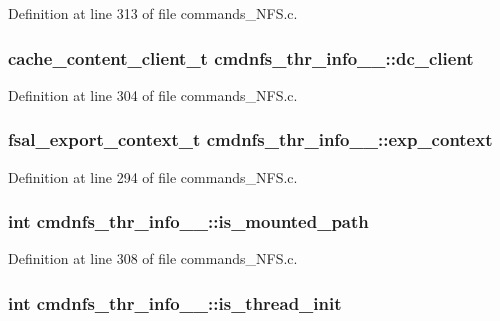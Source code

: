 Definition at line 313 of file commands\_\-NFS.c.
\subsubsection[{dc\_\-client}]{\setlength{\rightskip}{0pt plus 5cm}cache\_\-content\_\-client\_\-t {\bf cmdnfs\_\-thr\_\-info\_\-\_\-::dc\_\-client}}\label{structcmdnfs__thr__info_____25559c5388210fe7b20f047d80e9d969}




Definition at line 304 of file commands\_\-NFS.c.
\subsubsection[{exp\_\-context}]{\setlength{\rightskip}{0pt plus 5cm}fsal\_\-export\_\-context\_\-t {\bf cmdnfs\_\-thr\_\-info\_\-\_\-::exp\_\-context}}\label{structcmdnfs__thr__info_____258f911ec1e74edf76d91c76c71befd1}




Definition at line 294 of file commands\_\-NFS.c.
\subsubsection[{is\_\-mounted\_\-path}]{\setlength{\rightskip}{0pt plus 5cm}int {\bf cmdnfs\_\-thr\_\-info\_\-\_\-::is\_\-mounted\_\-path}}\label{structcmdnfs__thr__info_____cbab9ed57819b5a75c263ce6a7f2e40d}




Definition at line 308 of file commands\_\-NFS.c.
\subsubsection[{is\_\-thread\_\-init}]{\setlength{\rightskip}{0pt plus 5cm}int {\bf cmdnfs\_\-thr\_\-info\_\-\_\-::is\_\-thread\_\-init}}\label{structcmdnfs__thr__info_____09a128121a4c53f19ab460858c4a4487}




